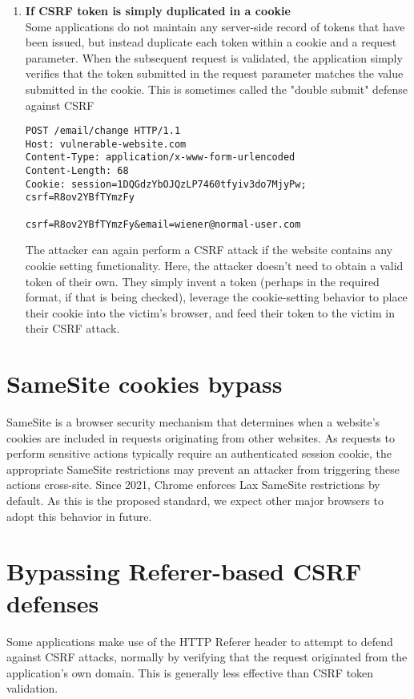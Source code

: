 \documentclass{article}
\begin{document}
\begin{enumerate}
\item \textbf{If CSRF token is simply duplicated in a cookie}\\
Some applications do not maintain any server-side record of tokens that have been issued, but instead duplicate each token within a cookie and a request parameter. When the subsequent request is validated, the application simply verifies that the token submitted in the request parameter matches the value submitted in the cookie. This is sometimes called the "double submit" defense against CSRF
			\begin{lstlisting}[frame=single]
POST /email/change HTTP/1.1
Host: vulnerable-website.com
Content-Type: application/x-www-form-urlencoded
Content-Length: 68
Cookie: session=1DQGdzYbOJQzLP7460tfyiv3do7MjyPw; csrf=R8ov2YBfTYmzFy

csrf=R8ov2YBfTYmzFy&email=wiener@normal-user.com
            \end{lstlisting}
The attacker can again perform a CSRF attack if the website contains any cookie setting functionality. Here, the attacker doesn't need to obtain a valid token of their own. They simply invent a token (perhaps in the required format, if that is being checked), leverage the cookie-setting behavior to place their cookie into the victim's browser, and feed their token to the victim in their CSRF attack. 


\end{enumerate}


\section*{SameSite cookies bypass}
SameSite is a browser security mechanism that determines when a website's cookies are included in requests originating from other websites. As requests to perform sensitive actions typically require an authenticated session cookie, the appropriate SameSite restrictions may prevent an attacker from triggering these actions cross-site. Since 2021, Chrome enforces Lax SameSite restrictions by default. As this is the proposed standard, we expect other major browsers to adopt this behavior in future. 

\newpage

\section*{Bypassing Referer-based CSRF defenses}
Some applications make use of the HTTP Referer header to attempt to defend against CSRF attacks, normally by verifying that the request originated from the application's own domain. This is generally less effective than CSRF token validation. 
\end{document}

